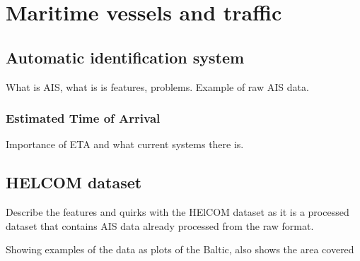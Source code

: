 \documentclass[../main.tex]{subfiles}
\begin{document}
\section{Maritime vessels and traffic}

\subsection{Automatic identification system}

What is AIS, what is is features, problems. Example of raw AIS data.

\subsubsection{Estimated Time of Arrival}

Importance of ETA and what current systems there is.

\subsection{HELCOM dataset}

Describe the features and quirks with the HElCOM dataset as it is a processed dataset that contains AIS data already processed from the raw format.

Showing examples of the data as plots of the Baltic, also shows the area covered
\end{document}

